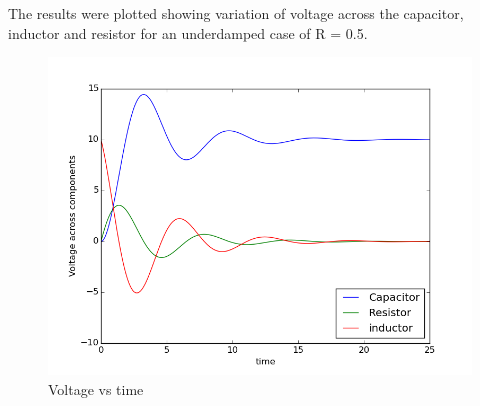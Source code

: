 \documentclass[12pt, a4paper]{report}
\begin{document}
The results were plotted showing variation of voltage across the capacitor, inductor and resistor for an underdamped case of R = 0.5.
\begin{figure}[H]
 \centering
 \includegraphics[width = \textwidth]{V.png}
 \caption{Voltage vs time}
 \label{V}
\end{figure}



\end{document}
